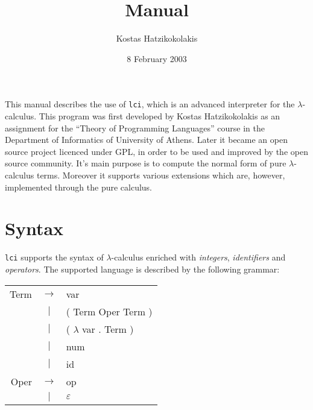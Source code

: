 \documentclass[a4paper,11pt]{article}
\author{
	Kostas Hatzikokolakis
}
\title{
	\kwd{lci} Manual
}
\date{8 February 2003}
\newcommand{\la}{$\lambda$}
\newcommand{\lci}{\texttt{lci}}
\newcommand{\lc}{$\lambda$-calculus}
\newcommand{\qm}[1]{``#1''}
\begin{document}
\maketitle
\vspace{60pt}

This manual describes the use of \lci{}, which is an advanced
interpreter for the \lc. This program was first developed by Kostas
Hatzikokolakis as an assignment for the \qm{Theory of Programming Languages} course
in the Department of Informatics of University of Athens. Later it became an
open source project licenced under GPL, in order to be used and improved by
the open source community. It's main purpose is to compute the normal form of
pure \lc{} terms. Moreover it supports various extensions which are, however,
implemented through the pure calculus.

\section{Syntax}
\lci{} supports the syntax of \lc{} enriched with \emph{integers}, \emph{identifiers}
and \emph{operators}. The supported language is described by the following grammar:

\begin{center}
	\begin{tabular}{rcl}
		Term	& $\rightarrow$ & var \\
		& $|$ & ( Term Oper Term ) \\
		& $|$ & ( \la{} var . Term ) \\
		& $|$ & num \\
		& $|$ & id \\
		Oper & $\rightarrow$ & op \\
		& $|$ & $\varepsilon$
	\end{tabular}
\end{center}
\end{document}
